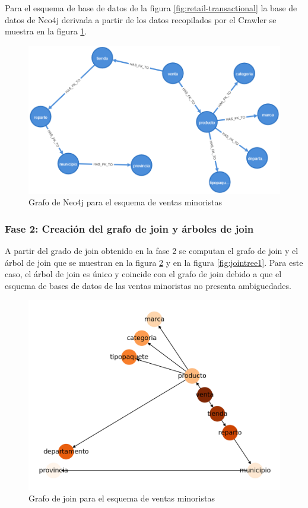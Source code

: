 Para el esquema de base de datos de la figura \ref{fig:retail-transactional} la base de datos de Neo4j derivada a 
partir de los datos recopilados por el Crawler se muestra en la figura \ref{fig:catalogexp1}.

\begin{figure}
  \centering
  \includegraphics[scale=0.4]{Graphics/graph (1).png}
  \caption{Grafo de Neo4j para el esquema de ventas minoristas}
  \label{fig:catalogexp1}
\end{figure}

\subsubsection{Fase 2: Creaci\'on del grafo de join y \'arboles de join}

A partir del grado de join obtenido en la fase 2 se computan el grafo de join y el \'arbol de 
join que se muestran en la figura \ref{fig:graphjoin1} y en la figura \ref{fig:jointree1}. Para este caso, 
el \'arbol de join es \'unico y coincide  con el grafo de join debido a que el esquema de bases de datos de 
las ventas minoristas no presenta ambiguedades.

\begin{figure}
  \centering
  \includegraphics[scale=0.6]{Graphics/joingraph1.png}
  \caption{Grafo de join para el esquema de ventas minoristas}
  \label{fig:graphjoin1}
\end{figure}

